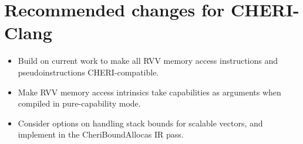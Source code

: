 \section{Recommended changes for CHERI-Clang}\label{chap:software:sec:chericlangchanges}
\begin{itemize}
    \item Build on current work to make all RVV memory access instructions and pseudoinstructions CHERI-compatible.
    \item Make RVV memory access intrinsics take capabilities as arguments when compiled in pure-capability mode.
    \item Consider options on handling stack bounds for scalable vectors, and implement in the CheriBoundAllocas IR pass.
\end{itemize}
